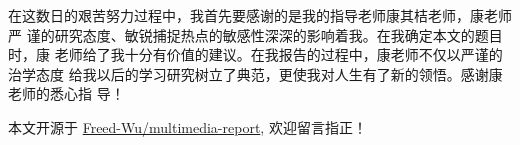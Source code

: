 \documentclass[../main]{subfiles}
\begin{document}
\begin{acknowledgement}

  在这数日的艰苦努力过程中，我首先要感谢的是我的指导老师康其桔老师，康老师严
  谨的研究态度、敏锐捕捉热点的敏感性深深的影响着我。在我确定本文的题目时，康
  老师给了我十分有价值的建议。在我报告的过程中，康老师不仅以严谨的治学态度
  给我以后的学习研究树立了典范，更使我对人生有了新的领悟。感谢康老师的悉心指
  导！

  本文开源于
  \href{https://github.com/Freed-Wu/multimedia-report}{Freed-Wu/multimedia-report},
  欢迎留言指正！
\end{acknowledgement}
\end{document}
